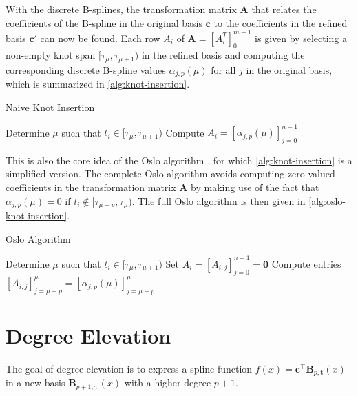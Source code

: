 With the discrete B-splines, the transformation matrix $\mathbf A$ that relates the coefficients of the B-spline in the original basis $\mathbf c$ to the coefficients in the refined basis $\mathbf c'$ can now be found. Each row $A_i$ of $\mathbf A = [A_i^T]_0^{m-1}$ is given by selecting a non-empty knot span $[\tau_\mu, \tau_{\mu+1})$ in the refined basis and computing the corresponding discrete B-spline values $\alpha_{j,p}(\mu)$ for all $j$ in the original basis, which is summarized in \cref{alg:knot-insertion}.

\begin{algorithm}
    \caption{Naive Knot Insertion}\label{alg:knot-insertion}
    \begin{algorithmic}
        \State Determine $\mu$ such that $t_i \in [\tau_\mu, \tau_{\mu+1})$
        \State Compute $A_i = [\alpha_{j,p}(\mu)]_{j=0}^{n-1}$
        \EndFor
    \end{algorithmic}
\end{algorithm}

This is also the core idea of the Oslo algorithm \citep{Cohen1980}, for which \cref{alg:knot-insertion} is a simplified version. The complete Oslo algorithm avoids computing zero-valued coefficients in the transformation matrix $\mathbf A$ by making use of the fact that $\alpha_{j,p}(\mu) = 0$ if $t_i \notin [\tau_{\mu-p}, \tau_{\mu})$. The full Oslo algorithm is then given in \cref{alg:oslo-knot-insertion}.

\begin{algorithm}
    \caption{Oslo Algorithm}\label{alg:oslo-knot-insertion}
    \begin{algorithmic}
        \State Determine $\mu$ such that $t_i \in [\tau_\mu, \tau_{\mu+1})$
        \State Set $A_i = [A_{i,j}]_{j=0}^{n-1} = \mathbf 0$
        \State Compute entries $[A_{i,j}]_{j=\mu-p}^\mu = [\alpha_{j,p}(\mu)]_{j=\mu-p}^{\mu}$
        \EndFor
    \end{algorithmic}
\end{algorithm}

\section{Degree Elevation}

The goal of degree elevation is to express a spline function $f(x) = \mathbf{c}^{\top} \mathbf{B}_{p, \mathbf{t}}(x)$ in a new basis $\mathbf{B}_{p+1, \boldsymbol{\tau}}(x)$ with a higher degree $p+1$. 

